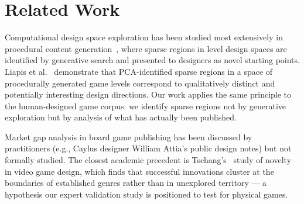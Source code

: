\section{Related Work}
\label{sec:related}

Computational design space exploration has been studied most extensively in procedural
content generation~\cite{shaker2016procedural}, where sparse regions in level design
spaces are identified by generative search and presented to designers as novel starting
points. Liapis et al.~\cite{liapis2013sentient} demonstrate that PCA-identified sparse
regions in a space of procedurally generated game levels correspond to qualitatively
distinct and potentially interesting design directions. Our work applies the same
principle to the human-designed game corpus: we identify sparse regions not by
generative exploration but by analysis of what has actually been published.

Market gap analysis in board game publishing has been discussed by practitioners
(e.g., Caylus designer William Attia's public design notes) but not formally studied.
The closest academic precedent is Tschang's~\cite{tschang2005videogames} study of
novelty in video game design, which finds that successful innovations cluster at the
boundaries of established genres rather than in unexplored territory --- a hypothesis
our expert validation study is positioned to test for physical games.
